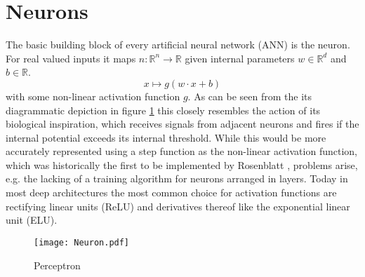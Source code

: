\section{Neurons}
\label{sec:Neurons}
The basic building block of every artificial neural network (ANN) is the neuron. For real valued inputs it maps $n: \mathbb{R}^n \rightarrow \mathbb{R}$ given internal parameters $w \in \mathbb{R}^d$ and $b \in \mathbb{R}$.
\begin{equation}
x \mapsto g(w \cdot x + b)
\end{equation}
with some non-linear activation function $g$. As can be seen from the its diagrammatic depiction in figure \ref{fig:Neuron} this closely resembles the action of its biological inspiration, which receives signals from adjacent neurons and fires if the internal potential exceeds its internal threshold. While this would be more accurately represented using a step function as the non-linear activation function, which was historically the first to be implemented by Rosenblatt \cite{Perceptron}, problems arise, e.g. the lacking of a training algorithm for neurons arranged in layers. Today in most deep architectures the most common choice for activation functions are rectifying linear units (ReLU) and derivatives thereof like the exponential linear unit (ELU).
\begin{figure}
\centering
  \texttt{[image: Neuron.pdf]}
  \caption{Perceptron}
  \label{fig:Neuron}
\end{figure}


